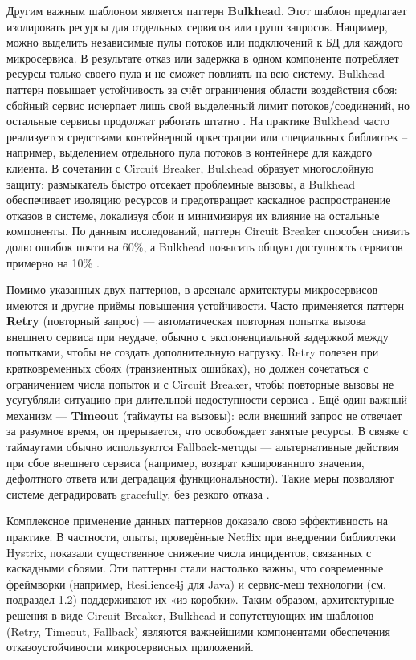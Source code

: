Другим важным шаблоном является паттерн \textbf{Bulkhead}. Этот шаблон предлагает изолировать ресурсы для отдельных сервисов или групп запросов. Например, можно выделить независимые пулы потоков или подключений к БД для каждого микросервиса. В результате отказ или задержка в одном компоненте потребляет ресурсы только своего пула и не сможет повлиять на всю систему. Bulkhead-паттерн повышает устойчивость за счёт ограничения области воздействия сбоя: сбойный сервис исчерпает лишь свой выделенный лимит потоков/соединений, но остальные сервисы продолжат работать штатно \cite{IEEE2023}. На практике Bulkhead часто реализуется средствами контейнерной оркестрации или специальных библиотек – например, выделением отдельного пула потоков в контейнере для каждого клиента. В сочетании с Circuit Breaker, Bulkhead образует многослойную защиту: размыкатель быстро отсекает проблемные вызовы, а Bulkhead обеспечивает изоляцию ресурсов и предотвращает каскадное распространение отказов в системе, локализуя сбои и минимизируя их влияние на остальные компоненты. По данным исследований, паттерн Circuit Breaker способен снизить долю ошибок почти на 60\%, а Bulkhead повысить общую доступность сервисов примерно на 10\% \cite{IEEE2023}.

Помимо указанных двух паттернов, в арсенале архитектуры микросервисов имеются и другие приёмы повышения устойчивости. Часто применяется паттерн \textbf{Retry} (повторный запрос) --- автоматическая повторная попытка вызова внешнего сервиса при неудаче, обычно с экспоненциальной задержкой между попытками, чтобы не создать дополнительную нагрузку. Retry полезен при кратковременных сбоях (транзиентных ошибках), но должен сочетаться с ограничением числа попыток и с Circuit Breaker, чтобы повторные вызовы не усугубляли ситуацию при длительной недоступности сервиса \cite{Punithavathy2024}. Ещё один важный механизм --- \textbf{Timeout} (таймауты на вызовы): если внешний запрос не отвечает за разумное время, он прерывается, что освобождает занятые ресурсы. В связке с таймаутами обычно используются Fallback-методы --- альтернативные действия при сбое внешнего сервиса (например, возврат кэшированного значения, дефолтного ответа или деградация функциональности). Такие меры позволяют системе деградировать gracefully, без резкого отказа \cite{Nygard2018}.

Комплексное применение данных паттернов доказало свою эффективность на практике. В частности, опыты, проведённые Netflix при внедрении библиотеки Hystrix, показали существенное снижение числа инцидентов, связанных с каскадными сбоями. Эти паттерны стали настолько важны, что современные фреймворки (например, Resilience4j для Java) и сервис-меш технологии (см. подраздел 1.2) поддерживают их «из коробки». Таким образом, архитектурные решения в виде Circuit Breaker, Bulkhead и сопутствующих им шаблонов (Retry, Timeout, Fallback) являются важнейшими компонентами обеспечения отказоустойчивости микросервисных приложений\cite{patternsraj}.

